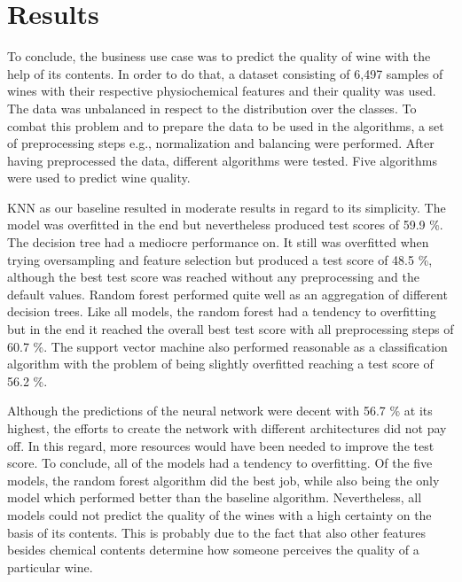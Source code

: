 \chapter{Results}
To conclude, the business use case was to predict the quality of wine with the help of its contents. In order to do that, a dataset consisting of 6,497 samples of wines with their respective physiochemical features and their quality was used. The data was unbalanced in respect to the distribution over the classes. To combat this problem and to prepare the data to be used in the algorithms, a set of preprocessing steps e.g., normalization and balancing were performed. After having preprocessed the data, different algorithms were tested. Five algorithms were used to predict wine quality. 

KNN as our baseline resulted in moderate results in regard to its simplicity. The model was overfitted in the end but nevertheless produced test scores of 59.9 \%. The decision tree had a mediocre performance on. It still was overfitted when trying oversampling and feature selection but produced a test score of 48.5 \%, although the best test score was reached without any preprocessing and the default values. Random forest performed quite well as an aggregation of different decision trees. Like all models, the random forest had a tendency to overfitting but in the end it reached the overall best test score with all preprocessing steps of 60.7 \%. The support vector machine also performed reasonable as a classification algorithm with the problem of being slightly overfitted reaching a test score of 56.2 \%.

Although the predictions of the neural network were decent with 56.7 \% at its highest, the efforts to create the network with different architectures did not pay off. In this regard, more resources would have been needed to improve the test score. To conclude, all of the models had a tendency to overfitting.
Of the five models, the random forest algorithm did the best job, while also being the only model which performed better than the baseline algorithm.
Nevertheless, all models could not predict the quality of the wines with a high certainty on the basis of its contents. This is probably due to the fact that also other features besides chemical contents determine how someone perceives the quality of a particular wine.